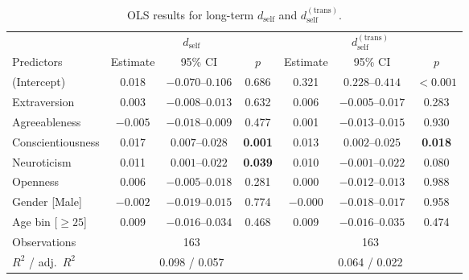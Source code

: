 \begin{table}[htbp]
\centering
\caption{OLS results for long-term $d_{\text{self}}$ and $d_{\text{self}}^{(\text{trans})}$.}
\label{tab:ols_signature_long}
\begin{tabular}{lcccccc}
\toprule
& \multicolumn{3}{c}{$d_{\text{self}}$} & \multicolumn{3}{c}{$d_{\text{self}}^{(\text{trans})}$} \\
\cmidrule(lr){2-4}\cmidrule(lr){5-7}
Predictors & Estimate & 95\% CI & $p$ & Estimate & 95\% CI & $p$ \\
\midrule
(Intercept)            & 0.018   & $-0.070$--$0.106$ & 0.686        & 0.321   & $0.228$--$0.414$ & \textbf{$<0.001$} \\
Extraversion           & 0.003   & $-0.008$--$0.013$ & 0.632        & 0.006   & $-0.005$--$0.017$ & 0.283 \\
Agreeableness          & $-0.005$& $-0.018$--$0.009$ & 0.477        & 0.001   & $-0.013$--$0.015$ & 0.930 \\
Conscientiousness      & 0.017   & $0.007$--$0.028$  & \textbf{0.001} & 0.013 & $0.002$--$0.025$  & \textbf{0.018} \\
Neuroticism            & 0.011   & $0.001$--$0.022$  & \textbf{0.039} & 0.010 & $-0.001$--$0.022$ & 0.080 \\
Openness               & 0.006   & $-0.005$--$0.018$ & 0.281        & 0.000   & $-0.012$--$0.013$ & 0.988 \\
Gender [Male]          & $-0.002$& $-0.019$--$0.015$ & 0.774        & $-0.000$& $-0.018$--$0.017$ & 0.958 \\
Age bin [$\ge 25$]     & 0.009   & $-0.016$--$0.034$ & 0.468        & 0.009   & $-0.016$--$0.035$ & 0.474 \\
\midrule
Observations           & \multicolumn{3}{c}{163} & \multicolumn{3}{c}{163} \\
$R^2$ / adj.\ $R^2$    & \multicolumn{3}{c}{0.098 / 0.057} & \multicolumn{3}{c}{0.064 / 0.022} \\
\bottomrule
\end{tabular}
\end{table}
